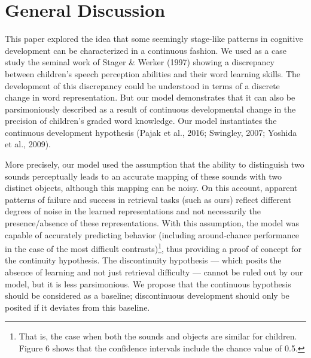\documentclass[english,,man]{apa6}
\let\rmarkdownfootnote\footnote%
\def\footnote{\protect\rmarkdownfootnote}
\begin{document}
\hypertarget{general-discussion}{%
\section{General Discussion}\label{general-discussion}}

This paper explored the idea that some seemingly stage-like patterns in cognitive development can be characterized in a continuous fashion. We used as a case study the seminal work of Stager \& Werker (1997) showing a discrepancy between children's speech perception abilities and their word learning skills. The development of this discrepancy could be understood in terms of a discrete change in word representation. But our model demonstrates that it can also be parsimoniously described as a result of continuous developmental change in the precision of children's graded word knowledge. Our model instantiates the continuous development hypothesis (Pajak et al., 2016; Swingley, 2007; Yoshida et al., 2009).

More precisely, our model used the assumption that the ability to distinguish two sounds perceptually leads to an accurate mapping of these sounds with two distinct objects, although this mapping can be noisy. On this account, apparent patterns of failure and success in retrieval tasks (such as ours) reflect different degrees of noise in the learned representations and not necessarily the presence/absence of these representations. With this assumption, the model was capable of accurately predicting behavior (including around-chance performance in the case of the most difficult contrasts)\footnote{That is, the case when both the sounds and objects are similar for children. Figure 6 shows that the confidence intervals include the chance value of 0.5.}, thus providing a proof of concept for the continuity hypothesis. The discontinuity hypothesis --- which posits the absence of learning and not just retrieval difficulty --- cannot be ruled out by our model, but it is less parsimonious. We propose that the continuous hypothesis should be considered as a baseline; discontinuous development should only be posited if it deviates from this baseline.
\end{document}
